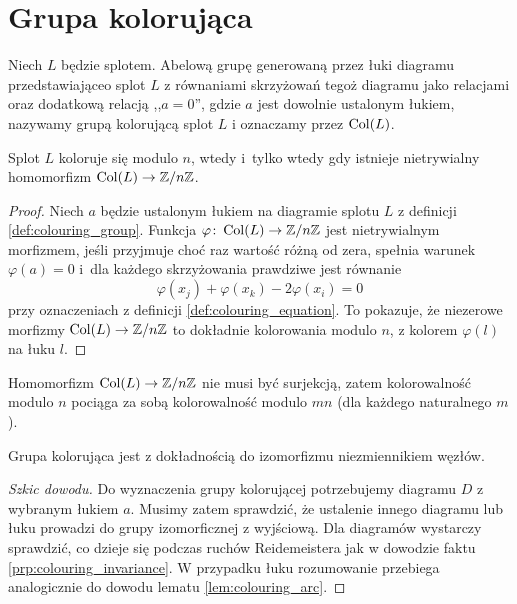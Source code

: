 
\section{Grupa kolorująca}
%

\begin{definition}
\label{def:colouring_group}%
    Niech $L$ będzie splotem.
    Abelową grupę generowaną przez łuki diagramu przedstawiająceo splot $L$ z równaniami skrzyżowań tegoż diagramu jako relacjami oraz dodatkową relacją ,,$a = 0$'', gdzie $a$ jest dowolnie ustalonym łukiem, nazywamy grupą kolorującą splot $L$ i oznaczamy przez $\operatorname{Col} (L)$.
\end{definition}

\begin{proposition}
\label{prp:colourings_are_morphisms}%
    Splot $L$ koloruje się modulo $n$, wtedy i~tylko wtedy gdy istnieje nietrywialny homomorfizm $\operatorname{Col}(L) \to \mathbb Z/n\mathbb Z$.
\end{proposition}

\begin{proof}
    Niech $a$ będzie ustalonym łukiem na diagramie splotu $L$ z definicji \ref{def:colouring_group}.
    Funkcja $\varphi \colon \operatorname{Col}(L) \to \mathbb Z/n\mathbb Z$ jest nietrywialnym morfizmem, jeśli przyjmuje choć raz wartość różną od zera, spełnia warunek $\varphi(a) = 0$ i~dla każdego skrzyżowania prawdziwe jest równanie
    \begin{equation}
        \varphi(x_j) + \varphi(x_k) - 2\varphi(x_i) = 0
    \end{equation}
    przy oznaczeniach z definicji \ref{def:colouring_equation}.
    To pokazuje, że niezerowe morfizmy $\operatorname{Col}(L) \to \mathbb Z/n\mathbb Z$ to dokładnie kolorowania modulo $n$, z kolorem $\varphi(l)$ na łuku $l$.
\end{proof}

Homomorfizm $\operatorname{Col} (L) \to \mathbb Z/n\mathbb Z$ nie musi być surjekcją, zatem kolorowalność modulo $n$ pociąga za sobą kolorowalność modulo $mn$ (dla każdego naturalnego $m$).

\begin{proposition}
    Grupa kolorująca jest z dokładnością do izomorfizmu niezmiennikiem węzłów.
\end{proposition}

\begin{proof}[Szkic dowodu]
    Do wyznaczenia grupy kolorującej potrzebujemy diagramu $D$ z wybranym łukiem $a$.
    Musimy zatem sprawdzić, że ustalenie innego diagramu lub łuku prowadzi do grupy izomorficznej z wyjściową.
    Dla diagramów wystarczy sprawdzić, co dzieje się podczas ruchów Reidemeistera jak w dowodzie faktu \ref{prp:colouring_invariance}.
    W przypadku łuku rozumowanie przebiega analogicznie do dowodu lematu \ref{lem:colouring_arc}.
\end{proof}


